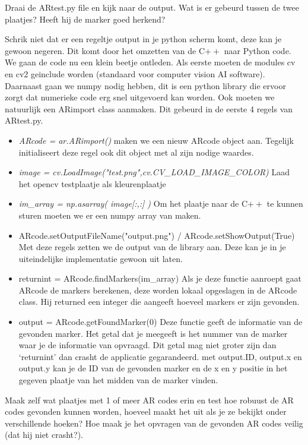 \documentclass[a4paper]{article}
\begin{document}
\begin{Exercise}
 Draai de ARtest.py file en kijk naar de output. Wat is er gebeurd tussen de twee plaatjes? Heeft hij de marker goed herkend?
\end{Exercise}
\vspace{10 mm}

Schrik niet dat er een regeltje output in je python scherm komt, deze kan je gewoon negeren. Dit komt door het omzetten van de C$\stackrel{}{++}$ naar Python code. 
We gaan de code nu een klein beetje ontleden. Als eerste moeten de modules cv en cv2 geinclude worden (standaard voor computer vision AI software). Daarnaast gaan we numpy nodig hebben, dit is een python library die ervoor zorgt dat numerieke code erg snel uitgevoerd kan worden. Ook moeten we natuurlijk een ARimport class aanmaken. Dit gebeurd in de eerste 4 regels van ARtest.py.
\begin{itemize}
\item \emph{ARcode = ar.ARimport()} maken we een nieuw ARcode object aan. Tegelijk initialiseert deze regel ook dit object met al zijn nodige waardes.
\item \emph{image = cv.LoadImage("test.png",cv.CV\_LOAD\_IMAGE\_COLOR)} Laad het opencv testplaatje als kleurenplaatje
\item \emph{im\_array = np.asarray( image[:,:] ) } Om het plaatje naar de C$\stackrel{}{++}$ te kunnen sturen moeten we er een numpy array van maken.
\item{ARcode.setOutputFileName("output.png") / ARcode.setShowOutput(True)} Met deze regels zetten we de output van de library aan. Deze kan je in je uiteindelijke implementatie gewoon uit laten.
\item{returnint = ARcode.findMarkers(im\_array)} Als je deze functie aanroept gaat ARcode de markers berekenen, deze worden lokaal opgeslagen in de ARcode class. Hij returned een integer die aangeeft hoeveel markers er zijn gevonden.
\item{output = ARcode.getFoundMarker(0)} Deze functie geeft de informatie van de gevonden marker. Het getal dat je meegeeft is het nummer van de marker waar je de informatie van opvraagd. Dit getal mag niet groter zijn dan `returnint' dan crasht de applicatie gegarandeerd. met output.ID, output.x en output.y kan je de ID van de gevonden marker en de x en y positie in het gegeven plaatje van het midden van de marker vinden.
\end{itemize}

\begin{Exercise}
Maak zelf wat plaatjes met 1 of meer AR codes erin en test hoe robuust de AR codes gevonden kunnen worden, hoeveel maakt het uit als je ze bekijkt onder verschillende hoeken? Hoe maak je het opvragen van de gevonden AR codes veilig (dat hij niet crasht?). 
\end{Exercise}
\vspace{10 mm}
\end{document}
